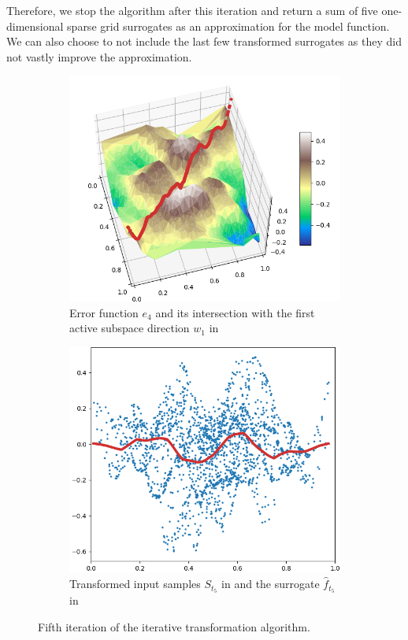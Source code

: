 \documentclass[
  a4paper,  %
  twoside,  %
  bibliography=totoc,
  headsepline,
  cleardoublepage=empty,
  parskip=half,
  draft=false
]{scrbook}
\begin{document}
Therefore, we stop the algorithm after this iteration and return a sum of five one-dimensional sparse grid surrogates as an approximation for the model function.
We can also choose to not include the last few transformed surrogates as they did not vastly improve the approximation.
\begin{mdframed}[style=style]
\begin{figure}[H]
\begin{subfigure}{.5\textwidth}
  \centering
  \includegraphics[width=.8\linewidth]{graphics/pipeline_current_5.png}
  \caption{Error function $e_4$ and its intersection with the first active subspace direction $w_1$ in \reddot}
\end{subfigure}%
\begin{subfigure}{.5\textwidth}
  \centering
  \includegraphics[width=.8\linewidth]{graphics/pipeline_local_5.png}
  \caption{Transformed input samples $S_{t_5}$ in \blue and the surrogate $\hat{f}_{t_5}$ in \reddot}
\end{subfigure}
\delimit
\caption{Fifth iteration of the iterative transformation algorithm.}
\label{fig:pipeline_5}
\end{figure}
\end{mdframed}
\end{document}
